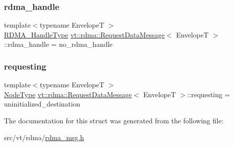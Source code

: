 \mbox{\label{structvt_1_1rdma_1_1_request_data_message_af405c0926174a99b19e148795461ce13}} 
\subsubsection{\texorpdfstring{rdma\+\_\+handle}{rdma\_handle}}
{\footnotesize\ttfamily template$<$typename EnvelopeT $>$ \\
\hyperlink{namespacevt_a10442579ec4e7ebef223818e64bcf908}{R\+D\+M\+A\+\_\+\+Handle\+Type} \hyperlink{structvt_1_1rdma_1_1_request_data_message}{vt\+::rdma\+::\+Request\+Data\+Message}$<$ EnvelopeT $>$\+::rdma\+\_\+handle = no\+\_\+rdma\+\_\+handle}

\mbox{\label{structvt_1_1rdma_1_1_request_data_message_aaa35273a1209ef165ff196930c5d1891}} 
\subsubsection{\texorpdfstring{requesting}{requesting}}
{\footnotesize\ttfamily template$<$typename EnvelopeT $>$ \\
\hyperlink{namespacevt_a866da9d0efc19c0a1ce79e9e492f47e2}{Node\+Type} \hyperlink{structvt_1_1rdma_1_1_request_data_message}{vt\+::rdma\+::\+Request\+Data\+Message}$<$ EnvelopeT $>$\+::requesting = uninitialized\+\_\+destination}



The documentation for this struct was generated from the following file\+:\begin{DoxyCompactItemize}
\item 
src/vt/rdma/\hyperlink{rdma__msg_8h}{rdma\+\_\+msg.\+h}\end{DoxyCompactItemize}
